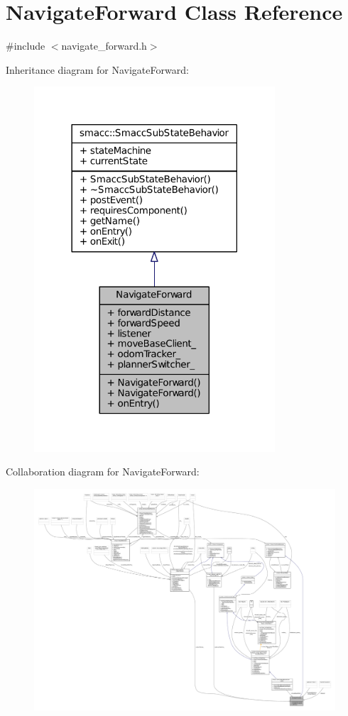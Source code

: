 \hypertarget{classNavigateForward}{}\section{Navigate\+Forward Class Reference}
\label{classNavigateForward}


{\ttfamily \#include $<$navigate\+\_\+forward.\+h$>$}



Inheritance diagram for Navigate\+Forward\+:
\nopagebreak
\begin{figure}[H]
\begin{center}
\leavevmode
\includegraphics[width=254pt]{classNavigateForward__inherit__graph}
\end{center}
\end{figure}


Collaboration diagram for Navigate\+Forward\+:
\nopagebreak
\begin{figure}[H]
\begin{center}
\leavevmode
\includegraphics[width=350pt]{classNavigateForward__coll__graph}
\end{center}
\end{figure}
